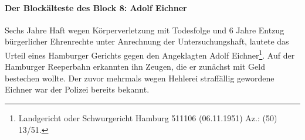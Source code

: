  

\paragraph{Der Blockälteste des Block 8: Adolf Eichner\label{eichner_ahndung}}
\glqq Sechs Jahre Haft wegen Körperverletzung mit Todesfolge und 6 Jahre Entzug bürgerlicher Ehrenrechte unter Anrechnung der Untersuchungshaft\grqq, lautete das Urteil eines Hamburger Gerichts gegen den Angeklagten Adolf Eichner\footnote{Landgericht oder Schwurgericht Hamburg 511106 (06.11.1951) Az.: (50) 13/51.}. Auf der Hamburger Reeperbahn erkannten ihn Zeugen, die er zunächst mit Geld bestechen wollte. Der zuvor mehrmals wegen Hehlerei straffällig gewordene Eichner war der Polizei bereits bekannt.


